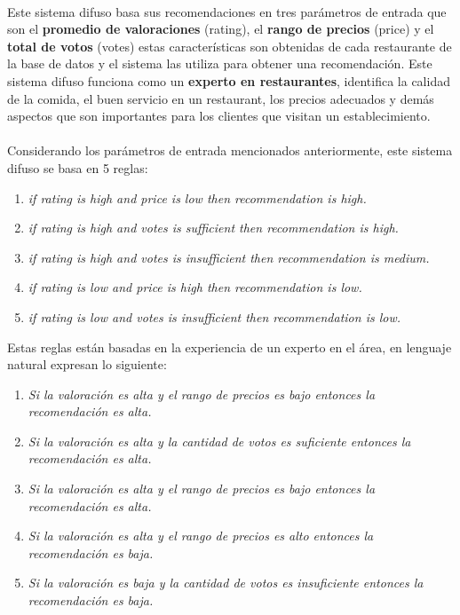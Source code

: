 \documentclass[12pt,letterpaper,oneside] {memoir}
\begin{document}
\paragraph{}
Este sistema difuso basa sus recomendaciones en tres parámetros de entrada que son el \textbf{promedio de valoraciones} (rating), el \textbf{rango de precios} (price) y el \textbf{total de votos} (votes) estas características son obtenidas de cada restaurante de la base de datos y el sistema las utiliza para obtener una recomendación.
Este sistema difuso funciona como un \textbf{experto en restaurantes}, identifica la calidad de la comida, el buen servicio en un restaurant, los precios adecuados y demás aspectos que son importantes para los clientes que visitan un establecimiento.
\paragraph*{}
Considerando los parámetros de entrada mencionados anteriormente, este sistema difuso se basa en  5 reglas:

\begin{enumerate}
\item \textit{if rating is high and price is low then recommendation is high.}
\item \textit{if rating is high and votes is sufficient then recommendation is high.}    
\item \textit{if rating is high and votes is insufficient then recommendation is medium.}    
\item \textit{if rating is low and price is high then recommendation is low.}   
\item \textit{if rating is low and votes is insufficient then recommendation is low.}
\end{enumerate}

Estas reglas están basadas en la experiencia de un experto en el área, en lenguaje natural expresan lo siguiente:

\begin{enumerate}
\item \textit{Si la valoración es alta y el rango de precios es bajo entonces la recomendación es alta.}
\item \textit{Si la valoración es alta y la cantidad de votos es suficiente entonces la recomendación es alta.}
\item \textit{Si la valoración es alta y el rango de precios es bajo entonces la recomendación es alta.}
\item \textit{Si la valoración es alta y el rango de precios es alto entonces la recomendación es baja.}
\item \textit{Si la valoración es baja y la cantidad de votos es insuficiente entonces la recomendación es baja.}
\end{enumerate}
\end{document}
